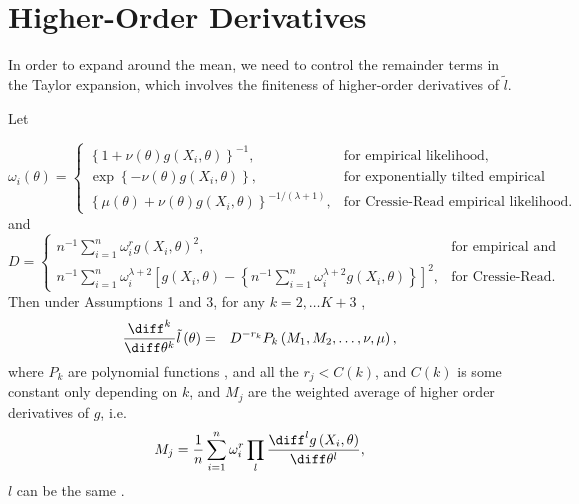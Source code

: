 \section{Higher-Order Derivatives}\label{app:high-order-der}

In order to expand around the mean, we need to control the
remainder terms in the Taylor expansion, which involves the finiteness of higher-order
derivatives of $\tilde{l}$. 
\begin{lemma}
\label{lem:control-higher-order-derivative-l}Let%
\begin{comment}
this lemma need change
\end{comment}
{} 
\[
\omega_{i}\left(\theta\right)=\begin{cases}
\left\{ 1+\nu\left(\theta\right)g\left(X_{i},\theta\right)\right\} ^{-1}, & \text{for empirical likelihood,}\\
\exp\left\{ -\nu\left(\theta\right)g\left(X_{i},\theta\right)\right\} , & \text{for exponentially tilted empirical likelihood,}\\
\left\{ \mu\left(\theta\right)+\nu\left(\theta\right)g\left(X_{i},\theta\right)\right\} ^{-1/\left(\lambda+1\right)}, & \text{for Cressie-Read empirical likelihood.}
\end{cases}
\]
and 
\[
D=\begin{cases}
n^{-1}\sum_{i=1}^{n}\omega_{i}^{r}g\left(X_{i},\theta\right)^{2}, & \text{for empirical and exponentiallytilted,}\\
n^{-1}\sum_{i=1}^{n}\omega_{i}^{\lambda+2}\left[g\left(X_{i},\theta\right)-\left\{ n^{-1}\sum_{i=1}^{n}\omega_{i}^{\lambda+2}g\left(X_{i},\theta\right)\right\} \right]^{2}, & \text{for Cressie-Read.}
\end{cases}
\]
Then  under Assumptions 1 and 3, for any $k=2,\ldots K+3$ , 
\begin{eqnarray*}
\frac{\diff^{k}}{\diff\theta^{k}}\tilde{l}\left(\theta\right) & = & D^{-r_{k}}P_{k}\left(M_{1},M_{2},\ldots,\nu,\mu\right),
\end{eqnarray*}
where $P_{k}$ are polynomial functions , and all the $r_{j}<C\left(k\right)$,
and $C\left(k\right)$ is some constant only depending on $k$, and
$M_{j}$ are the weighted average of higher order derivatives of $g$,
i.e. 
\[
M_{j}=\frac{1}{n}\sum_{i=1}^{n}\omega_{i}^{r}\prod_{l}\frac{\diff^{l}g\left(X_{i},\theta\right)}{\diff\theta^{l}},
\]
$l$ can be the same . \end{lemma}
